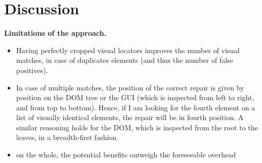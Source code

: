 \section{Discussion}\label{sec:discussion}

\textbf{Limitations of the approach.} 

\begin{itemize}
\item Having perfectly cropped visual locators improves the number of visual matches, in case of duplicates elements (and thus the number of false positives).
\item In case of multiple matches, the position of the correct repair is given by position on the DOM tree or the GUI (which is inspected from left to right, and from top to bottom). Hence, if I am looking for the fourth element on a list of visually identical elements, the repair will be in fourth position. A similar reasoning holds for the DOM, which is inspected from the root to the leaves, in a breadth-first fashion.
\item on the whole, the potential benefits outweigh the foreseeable overhead
\end{itemize}

